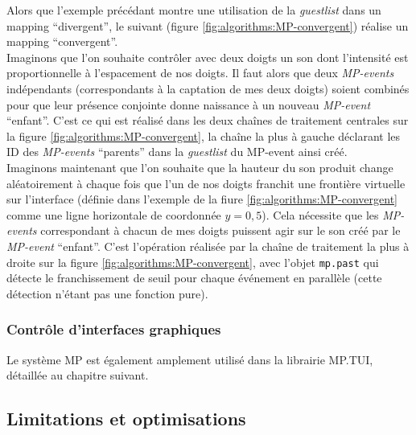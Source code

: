 \noindent Alors que l'exemple précédant montre une utilisation de la \textit{guestlist} dans un mapping ``divergent'', le suivant (figure \ref{fig:algorithms:MP-convergent}) réalise un mapping ``convergent''.\\
\indent Imaginons que l'on souhaite contrôler avec deux doigts un son dont l'intensité est proportionnelle à l'espacement de nos doigts. Il faut alors que deux \textit{MP-events} indépendants (correspondants à la captation de mes deux doigts) soient combinés pour que leur présence conjointe donne naissance à un nouveau \textit{MP-event} ``enfant''. C'est ce qui est réalisé dans les deux chaînes de traitement centrales sur la figure \ref{fig:algorithms:MP-convergent}, la chaîne la plus à gauche déclarant les ID des \textit{MP-events} ``parents'' dans la \textit{guestlist} du MP-event ainsi créé.\\
\indent Imaginons maintenant que l'on souhaite que la hauteur du son produit change aléatoirement à chaque fois que l'un de nos doigts franchit une frontière virtuelle sur l'interface (définie dans l'exemple de la fiure \ref{fig:algorithms:MP-convergent} comme une ligne horizontale de coordonnée $y=0,5$). Cela nécessite que les \textit{MP-events} correspondant à chacun de mes doigts puissent agir sur le son créé par le \textit{MP-event} ``enfant''. C'est l'opération réalisée par la chaîne de traitement la plus à droite sur la figure \ref{fig:algorithms:MP-convergent}, avec l'objet \verb|mp.past| qui détecte le franchissement de seuil pour chaque événement en parallèle (cette détection n'étant pas une fonction pure).


\subsubsection*{Contrôle d'interfaces graphiques}
\label{sec:algorithms:example-mpTUI}
\noindent Le système MP est également amplement utilisé dans la librairie MP.TUI, détaillée au chapitre suivant.


\subsection{Limitations et optimisations}


